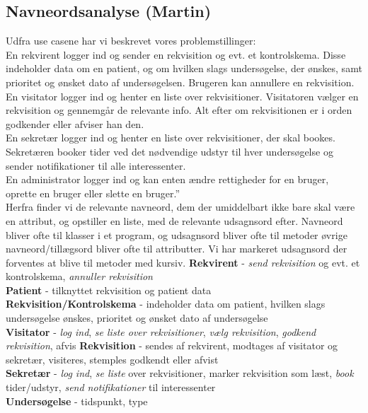 \subsection*{Navneordsanalyse (Martin)}
Udfra use casene har vi beskrevet vores problemstillinger:\\
En rekvirent logger ind og sender en rekvisition og evt. et kontrolskema. Disse
indeholder data om en patient, og om hvilken slags undersøgelse, der ønskes,
samt prioritet og ønsket dato af undersøgelsen. Brugeren kan annullere en
rekvisition.\\
En visitator logger ind og henter en liste over rekvisitioner. Visitatoren
vælger en rekvisition og gennemgår de relevante info. Alt efter om rekvisitionen
er i orden godkender eller afviser han den.\\
En sekretær logger ind og henter en liste over rekvisitioner, der skal bookes.
Sekretæren booker tider ved det nødvendige udstyr til hver undersøgelse og
sender notifikationer til alle interessenter.\\
En administrator logger ind og kan enten ændre rettigheder for en bruger,
oprette en bruger eller slette en bruger.”\\
Herfra finder vi de relevante navneord, dem der umiddelbart ikke bare skal være
en attribut, og opstiller en liste, med de relevante udsagnsord efter. Navneord
bliver ofte til klasser i et program, og udsagnsord bliver ofte til metoder
øvrige navneord/tillægsord bliver ofte til attributter. Vi har markeret
udsagnsord der forventes at blive til metoder med kursiv.
\textbf{Rekvirent} - \emph{send rekvisition} og evt. et kontrolskema, 
\emph{annuller rekvisition}\\
\textbf{Patient} - tilknyttet rekvisition og patient data\\
\textbf{Rekvisition/Kontrolskema} - indeholder data om patient, hvilken slags
undersøgelse ønskes, prioritet og ønsket dato af undersøgelse\\
\textbf{Visitator} - \emph{log ind}, \emph{se liste over rekvisitioner},
\emph{vælg rekvisition}, \emph{godkend rekvisition}, afvis 
\textbf{Rekvisition} - sendes af rekvirent, modtages af visitator og sekretær,
visiteres, stemples godkendt eller afvist\\
\textbf{Sekretær} - \emph{log ind}, \emph{se liste} over rekvisitioner, marker
rekvisition som læst, \emph{book} tider/udstyr, \emph{send notifikationer} til
interessenter\\
\textbf{Undersøgelse} - tidspunkt, type\\
